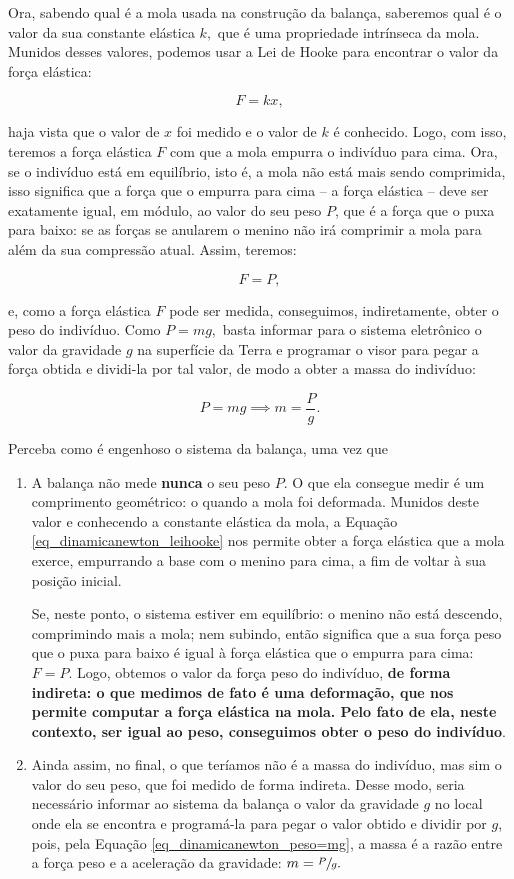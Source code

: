 Ora, sabendo qual é a mola usada na construção da balança, saberemos qual é o valor da sua constante elástica $k,$ que é uma propriedade intrínseca da mola. Munidos desses valores, podemos usar a Lei de Hooke para encontrar o valor da força elástica:

$$ F = kx,$$

\noindent haja vista que o valor de $x$ foi medido e o valor de $k$ é conhecido. Logo, com isso, teremos a força elástica $F$ com que a mola empurra o indivíduo para cima. Ora, se o indivíduo está em equilíbrio, isto é, a mola não está mais sendo comprimida, isso significa que a força que o empurra para cima -- a força elástica -- deve ser exatamente igual, em módulo, ao valor do seu peso $P$, que é a força que o puxa para baixo: se as forças se anularem o menino não irá comprimir a mola para além da sua compressão atual. Assim, teremos:

$$ F=P,$$

\noindent e, como a força elástica $F$ pode ser medida, conseguimos, indiretamente, obter o peso do indivíduo. Como $P=mg,$ basta informar para o sistema eletrônico o valor da gravidade $g$ na superfície da Terra e programar o visor para pegar a força obtida e dividi-la por tal valor, de modo a obter a massa do indivíduo:

$$ P =mg \implies m = \dfrac{P}{g}.$$

Perceba como é engenhoso o sistema da balança, uma vez que

\begin{enumerate}
    \item [(i)] A balança não mede \textbf{nunca} o seu peso $P$. O que ela consegue medir é um comprimento geométrico: o quando a mola foi deformada. Munidos deste valor e conhecendo a constante elástica da mola, a Equação \eqref{eq_dinamicanewton_leihooke} nos permite obter a força elástica que a mola exerce, empurrando a base com o menino para cima, a fim de voltar à sua posição inicial. 

    Se, neste ponto, o sistema estiver em equilíbrio: o menino não está descendo, comprimindo mais a mola; nem subindo, então significa que a sua força peso que o puxa para baixo é igual à força elástica que o empurra para cima: $F=P.$ Logo, obtemos o valor da força peso do indivíduo, \textbf{de forma indireta: o que medimos de fato é uma deformação, que nos permite computar a força elástica na mola. Pelo fato de ela, neste contexto, ser igual ao peso, conseguimos obter o peso do indivíduo}.

    \item [(ii)] Ainda assim, no final, o que teríamos não é a massa do indivíduo, mas sim o valor do seu peso, que foi medido de forma indireta. Desse modo, seria necessário informar ao sistema da balança o valor da gravidade $g$ no local onde ela se encontra e programá-la para pegar o valor obtido e dividir por $g$, pois, pela Equação \eqref{eq_dinamicanewton_peso=mg}, a massa é a razão entre a força peso e a aceleração da gravidade: $m=\sfrac{P}{g}.$
\end{enumerate}



